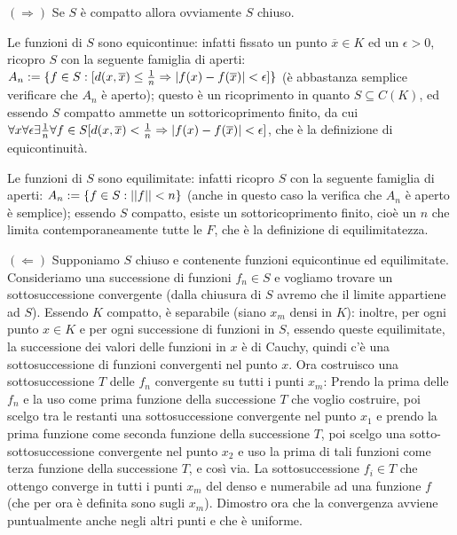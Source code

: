 $(\Rightarrow)$ Se $S$ è compatto allora ovviamente $S$ chiuso.

Le funzioni di $S$ sono equicontinue: infatti fissato un punto $\overline x\in K$ ed un $\epsilon>0$, ricopro $S$ con la seguente famiglia di aperti: $A_n:=\{f\in S : [d(x,\overline x)\le\frac{1}{n}\Rightarrow\left|f(x)-f(\overline x)\right|<\epsilon]\}$ (è abbastanza semplice verificare che $A_n$ è aperto); questo è un ricoprimento in quanto $S\subseteq C(K)$, ed essendo $S$ compatto ammette un sottoricoprimento finito, da cui $\forall x\forall\epsilon\exists\frac{1}{n}\forall f\in S[d(x,\overline x)<\frac{1}{n}\Rightarrow\left|f(x)-f(\overline x)\right|<\epsilon]$, che è la definizione di equicontinuità.

Le funzioni di $S$ sono equilimitate: infatti ricopro $S$ con la seguente famiglia di aperti: $A_n:=\{f\in S : \left|\left|f\right|\right|<n\}$ (anche in questo caso la verifica che $A_n$ è aperto è semplice); essendo $S$ compatto, esiste un sottoricoprimento finito, cioè un $n$ che limita contemporaneamente tutte le $F$, che è la definizione di equilimitatezza.

$(\Leftarrow)$ Supponiamo $S$ chiuso e contenente funzioni equicontinue ed equilimitate. Consideriamo una successione di funzioni $f_n\in S$ e vogliamo trovare un sottosuccessione convergente (dalla chiusura di $S$ avremo che il limite appartiene ad $S$). Essendo $K$ compatto, è separabile (siano $x_m$ densi in $K$): inoltre, per ogni punto $x\in K$ e per ogni successione di funzioni in $S$, essendo queste equilimitate, la successione dei valori delle funzioni in $x$ è di Cauchy, quindi c'è una sottosuccessione di funzioni convergenti nel punto $x$. Ora costruisco una sottosuccessione $T$ delle $f_n$ convergente su tutti i punti $x_m$: Prendo la prima delle $f_n$ e la uso come prima funzione della successione $T$ che voglio costruire, poi scelgo tra le restanti una sottosuccessione convergente nel punto $x_1$ e prendo la prima funzione come seconda funzione della successione $T$, poi scelgo una sotto-sottosuccessione convergente nel punto $x_2$ e uso la prima di tali funzioni come terza funzione della successione $T$, e così via. La sottosuccessione $f_i\in T$ che ottengo converge in tutti i punti $x_m$ del denso e numerabile ad una funzione $f$ (che per ora è definita sono sugli $x_m$). Dimostro ora che la convergenza avviene puntualmente anche negli altri punti e che è uniforme.

